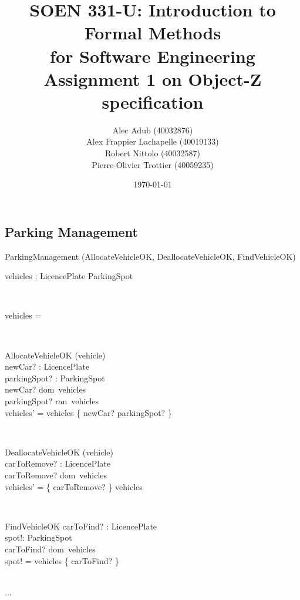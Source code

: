 \documentclass[12pt]{article}
\title{SOEN 331-U: Introduction to Formal Methods\\for Software Engineering\\
Assignment 1 on Object-Z specification}
\author{\begin{tabular}{c}
Alec Adub (40032876) \tabularnewline
Alex Frappier Lachapelle (40019133) \tabularnewline
Robert Nittolo (40032587) \tabularnewline
Pierre-Olivier Trottier (40059235) \tabularnewline\\
\end{tabular}
}
\date{\today}
\begin{document}
\begin{spacing}{1.5}

\maketitle

\newpage

\section{Parking Management}

\begin{class}{ParkingManagement}
\also
\upharpoonright (AllocateVehicleOK, DeallocateVehicleOK, FindVehicleOK) \\
\begin{state}
vehicles : LicencePlate  \rightarrowtail ParkingSpot\\
\where
\end{state} \\
\begin{init}
vehicles = \emptyset %
\end{init} \\
\begin{op}{AllocateVehicleOK}
\Delta (vehicle) \\
newCar? : LicencePlate\\
parkingSpot? : ParkingSpot\\
\ST
newCar? \notin dom~vehicles\\
parkingSpot? \notin ran~vehicles\\
vehicles' = vehicles \union \{ newCar? \rightarrowtail parkingSpot? \}
\end{op}\\
\begin{op}{DeallocateVehicleOK}
\Delta (vehicle) \\
carToRemove? : LicencePlate\\
\ST
carToRemove? \in dom~vehicles\\
vehicles' = \{ carToRemove? \} \ndres vehicles
\end{op}\\
\begin{op}{FindVehicleOK}
carToFind? : LicencePlate\\
spot!: ParkingSpot\\
\ST
carToFind? \in dom~vehicles\\
spot! = vehicles \{ carToFind? \}
\end{op}\\
...\\
\end{class}


\end{spacing}
\end{document}
